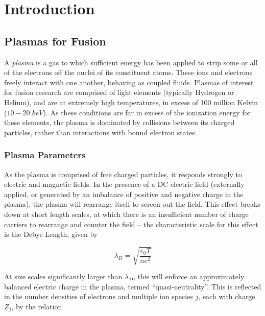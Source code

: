 \chapter{Introduction}\label{ch:Introduction}



\section{Plasmas for Fusion}\label{sec:intro_plasmas}

A \emph{plasma} is a gas to which sufficient energy has been applied to strip some or all of the electrons off the nuclei of its constituent atoms.  These ions and electrons freely interact with one another, behaving as coupled fluids.  Plasmas of interest for fusion research are comprised of light elements (typically Hydrogen or Helium), and are at extremely high temperatures, in excess of 100 million Kelvin ($10-20 \;\si{keV}$).  As these conditions are far in excess of the ionization energy for these elements, the plasma is dominated by collisions between its charged particles, rather than interactions with bound electron states.

\subsection{Plasma Parameters}\label{subsec:intro_params}

As the plasma is comprised of free charged particles, it responds strongly to electric and magnetic fields.  In the presence of a DC electric field (externally applied, or generated by an imbalance of positive and negative charge in the plasma), the plasma will rearrange itself to screen out the field.  This effect breaks down at short length scales, at which there is an insufficient number of charge carriers to rearrange and counter the field -- the characteristic scale for this effect is the Debye Length, given by

\begin{equation}\label{eq:debye}
 \lambda_D = \sqrt{ \frac{\varepsilon_0 T}{n e^2} }
\end{equation}

\noindent At size scales significantly larger than $\lambda_D$, this will enforce an approximately balanced electric charge in the plasma, termed ``quasi-neutrality''.  This is reflected in the number densities of electrons and multiple ion species $j$, each with charge $Z_j$, by the relation

